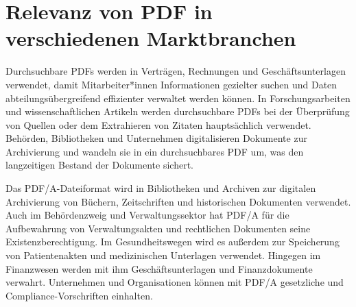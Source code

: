 \section{Relevanz von PDF in verschiedenen Marktbranchen}
Durchsuchbare PDFs werden in Verträgen, Rechnungen und Geschäftsunterlagen verwendet, damit Mitarbeiter*innen Informationen gezielter suchen und Daten abteilungsübergreifend effizienter verwaltet werden können. In Forschungsarbeiten und wissenschaftlichen Artikeln werden durchsuchbare PDFs bei der Überprüfung von Quellen oder dem Extrahieren von Zitaten hauptsächlich verwendet. Behörden, Bibliotheken und Unternehmen digitalisieren Dokumente zur Archivierung und wandeln sie in ein durchsuchbares PDF um, was den langzeitigen Bestand der Dokumente sichert. \cite{adobe-search}

Das PDF/A-Dateiformat wird in Bibliotheken und Archiven zur digitalen Archivierung von Büchern, Zeitschriften und historischen Dokumenten verwendet. Auch im Behördenzweig und Verwaltungssektor hat PDF/A für die Aufbewahrung von Verwaltungsakten und rechtlichen Dokumenten seine Existenzberechtigung. Im Gesundheitswegen wird es außerdem zur Speicherung von Patientenakten und medizinischen Unterlagen verwendet. Hingegen im Finanzwesen werden mit ihm Geschäftsunterlagen und Finanzdokumente verwahrt. Unternehmen und Organisationen können mit PDF/A gesetzliche und Compliance-Vorschriften einhalten. \cite{adobe-pdf-a}